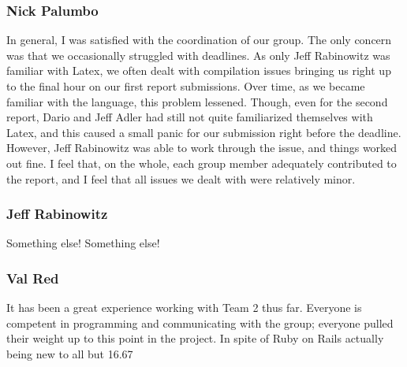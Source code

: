 \subsubsection{Nick Palumbo}
In general, I was satisfied with the coordination of our group. The only concern was that we occasionally struggled with deadlines. As only Jeff Rabinowitz was familiar with Latex, we often dealt with compilation issues bringing us right up to the final hour on our first report submissions. Over time, as we became familiar with the language, this problem lessened. Though, even for the second report, Dario and Jeff Adler had still not quite familiarized themselves with Latex, and this caused a small panic for our submission right before the deadline. However, Jeff Rabinowitz was able to work through the issue, and things worked out fine. I feel that, on the whole, each group member adequately contributed to the report, and I feel that all issues we dealt with were relatively minor.\\

\subsubsection{Jeff Rabinowitz}
Something else! Something else! \\

\subsubsection{Val Red}
It has been a great experience working with Team 2 thus far. Everyone is competent in programming and communicating with the group; everyone pulled their weight up to this point in the project. In spite of Ruby on Rails actually being new to all but 16.67%

